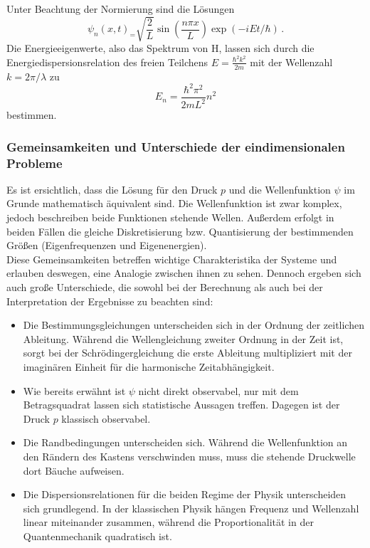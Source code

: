 Unter Beachtung der Normierung sind die Lösungen
\begin{equation}
  \psi_n(x,t)_ = \sqrt{\frac{2}{L}} \sin\left(\frac{n \pi x}{L}\right) \exp(-i E t / \hbar)\,.
  \label{eqn:kastenLoesung}
\end{equation}
Die Energieeigenwerte, also das Spektrum von H, lassen sich durch die Energiedispersionsrelation des freien Teilchens $E = \frac{\hbar^2 k^2}{2m}$ mit der Wellenzahl $k = 2 \pi / \lambda$ zu
\begin{equation}
  E_n = \frac{\hbar^2 \pi^2}{2 m L^2} n^2
  \label{eqn:kastenEnergien}
\end{equation}
bestimmen.

\subsubsection{Gemeinsamkeiten und Unterschiede der eindimensionalen Probleme}
Es ist ersichtlich, dass die Lösung für den Druck $p$ und die Wellenfunktion $\psi$ im Grunde mathematisch äquivalent sind. Die Wellenfunktion ist zwar komplex, jedoch beschreiben beide Funktionen stehende Wellen. Außerdem erfolgt in beiden Fällen die gleiche Diskretisierung bzw. Quantisierung der bestimmenden Größen (Eigenfrequenzen und Eigenenergien).\\
Diese Gemeinsamkeiten betreffen wichtige Charakteristika der Systeme und erlauben deswegen, eine Analogie zwischen ihnen zu sehen. Dennoch ergeben sich auch große Unterschiede, die sowohl bei der Berechnung als auch bei der Interpretation der Ergebnisse zu beachten sind:
\begin{itemize}
  \item Die Bestimmungsgleichungen unterscheiden sich in der Ordnung der zeitlichen Ableitung. Während die Wellengleichung zweiter Ordnung in der Zeit ist, sorgt bei der Schrödingergleichung die erste Ableitung multipliziert mit der imaginären Einheit für die harmonische Zeitabhängigkeit.
  \item Wie bereits erwähnt ist $\psi$ nicht direkt observabel, nur mit dem Betragsquadrat lassen sich statistische Aussagen treffen. Dagegen ist der Druck $p$ klassisch observabel.
  \item Die Randbedingungen unterscheiden sich. Während die Wellenfunktion an den Rändern des Kastens verschwinden muss, muss die stehende Druckwelle dort Bäuche aufweisen.
  \item Die Dispersionsrelationen für die beiden Regime der Physik unterscheiden sich grundlegend. In der klassischen Physik hängen Frequenz und Wellenzahl linear miteinander zusammen, während die Proportionalität in der Quantenmechanik quadratisch ist.
\end{itemize}

